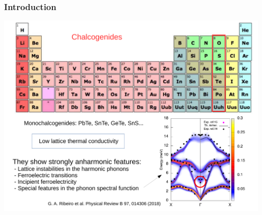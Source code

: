 \documentclass{beamer}
\begin{document}

\begin{frame}

\frametitle{Introduction}
\vspace{-0.5cm}
\begin{center}
\includegraphics[width=0.85\linewidth]{Pictures/INTRO/chalcogenides.pdf}
\end{center}

\end{frame}

\end{document}

